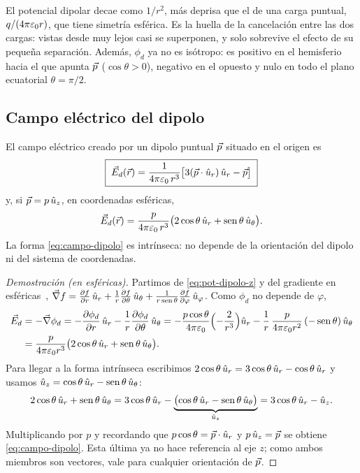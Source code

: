 \begin{observacion}\label{obs:decaimiento}
El potencial dipolar decae como $1/r^{2}$, más deprisa que el de una carga puntual, $q/(4\pi\varepsilon_{0} r)$, que tiene simetría esférica. Es la
huella de la cancelación entre las dos cargas: vistas desde muy lejos casi se superponen, y solo sobrevive el efecto de su pequeña
separación. Además, $\phi_{d}$ ya no es isótropo: es positivo en el hemisferio hacia el que apunta $\vec{p}$ ($\cos\theta>0$), negativo en el
opuesto y nulo en todo el plano ecuatorial $\theta=\pi/2$.
\end{observacion}

\subsection{Campo eléctrico del dipolo}\label{sec:dipolo-campo}
\begin{teorema}\label{teo:campo-dipolo}
El campo eléctrico creado por un dipolo puntual $\vec{p}$ situado en el origen es
\begin{equation}\label{eq:campo-dipolo}
  \boxed{\;\vec{E}_{d}(\vec{r})=\frac{1}{4\pi\varepsilon_{0}\,r^{3}}\bigl[3(\vec{p}\cdot\hat{u}_{r})\,\hat{u}_{r}-\vec{p}\bigr]\;}
\end{equation}
y, si $\vec{p}=p\,\hat{u}_{z}$, en coordenadas esféricas,
\begin{equation}\label{eq:campo-dipolo-esf}
  \vec{E}_{d}(\vec{r})=\frac{p}{4\pi\varepsilon_{0}\,r^{3}}\bigl(2\cos\theta\,\hat{u}_{r}+\operatorname{sen}\theta\,\hat{u}_{\theta}\bigr).
\end{equation}
La forma \cref{eq:campo-dipolo} es intrínseca: no depende de la orientación del dipolo ni del sistema de coordenadas.
\end{teorema}
\begin{proof}[Demostración (en esféricas)]
Partimos de \cref{eq:pot-dipolo-z} y del gradiente en esféricas~\cite{TEMA0},
$\vec{\nabla} f=\frac{\partial f}{\partial r}\,\hat{u}_{r}+\frac{1}{r}\frac{\partial f}{\partial \theta}\,\hat{u}_{\theta}+\frac{1}{r\operatorname{sen}\theta}\frac{\partial f}{\partial \varphi}\,\hat{u}_{\varphi}$. Como $\phi_{d}$ no depende de $\varphi$,
\begin{align*}
  \vec{E}_{d}&=-\vec{\nabla}\phi_{d}=-\frac{\partial \phi_{d}}{\partial r}\,\hat{u}_{r}-\frac{1}{r}\frac{\partial \phi_{d}}{\partial \theta}\,\hat{u}_{\theta}
  =-\frac{p\cos\theta}{4\pi\varepsilon_{0}}\Bigl(-\frac{2}{r^{3}}\Bigr)\hat{u}_{r}-\frac{1}{r}\,\frac{p}{4\pi\varepsilon_{0} r^{2}}\,(-\operatorname{sen}\theta)\,\hat{u}_{\theta}\\
  &=\frac{p}{4\pi\varepsilon_{0} r^{3}}\bigl(2\cos\theta\,\hat{u}_{r}+\operatorname{sen}\theta\,\hat{u}_{\theta}\bigr).
\end{align*}
Para llegar a la forma intrínseca escribimos $2\cos\theta\,\hat{u}_{r}=3\cos\theta\,\hat{u}_{r}-\cos\theta\,\hat{u}_{r}$ y usamos $\hat{u}_{z}=\cos\theta\,\hat{u}_{r}-\operatorname{sen}\theta\,\hat{u}_{\theta}$:
\[
  2\cos\theta\,\hat{u}_{r}+\operatorname{sen}\theta\,\hat{u}_{\theta}=3\cos\theta\,\hat{u}_{r}-\underbrace{\bigl(\cos\theta\,\hat{u}_{r}-\operatorname{sen}\theta\,\hat{u}_{\theta}\bigr)}_{\hat{u}_{z}}=3\cos\theta\,\hat{u}_{r}-\hat{u}_{z} .
\]
Multiplicando por $p$ y recordando que $p\cos\theta=\vec{p}\cdot\hat{u}_{r}$ y $p\,\hat{u}_{z}=\vec{p}$ se obtiene \cref{eq:campo-dipolo}. Esta última ya no hace referencia
al eje $z$; como ambos miembros son vectores, vale para cualquier orientación de $\vec{p}$.
\end{proof}

